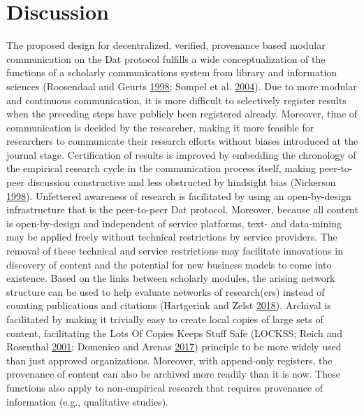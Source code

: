 \documentclass[a5paper]{book}
\begin{document}
\section{Discussion}\label{discussion-8}

The proposed design for decentralized, verified, provenance based
modular communication on the Dat protocol fulfills a wide
conceptualization of the functions of a scholarly communications system
from library and information sciences (Roosendaal and Geurts
\protect\hyperlink{ref-roosendaal1998}{1998}; Sompel et al.
\protect\hyperlink{ref-doi:10.1045ux2fseptember2004-vandesompel}{2004}).
Due to more modular and continuous communication, it is more difficult
to selectively register results when the preceding steps have publicly
been registered already. Moreover, time of communication is decided by
the researcher, making it more feasible for researchers to communicate
their research efforts without biases introduced at the journal stage.
Certification of results is improved by embedding the chronology of the
empirical research cycle in the communication process itself, making
peer-to-peer discussion constructive and less obstructed by hindsight
bias (Nickerson
\protect\hyperlink{ref-doi:10.1037ux2f1089-2680.2.2.175}{1998}).
Unfettered awareness of research is facilitated by using an
open-by-design infrastructure that is the peer-to-peer Dat protocol.
Moreover, because all content is open-by-design and independent of
service platforms, text- and data-mining may be applied freely without
technical restrictions by service providers. The removal of these
technical and service restrictions may facilitate innovations in
discovery of content and the potential for new business models to come
into existence. Based on the links between scholarly modules, the
arising network structure can be used to help evaluate networks of
research(ers) instead of counting publications and citations (Hartgerink
and Zelst
\protect\hyperlink{ref-doi:10.3390ux2fpublications6020021}{2018}).
Archival is facilitated by making it trivially easy to create local
copies of large sets of content, facilitating the Lots Of Copies Keeps
Stuff Safe (LOCKSS; Reich and Rosenthal
\protect\hyperlink{ref-doi:10.1045ux2fjune2001-reich}{2001}; Domenico
and Arenas
\protect\hyperlink{ref-doi:10.1103ux2fphysreve.95.022313}{2017})
principle to be more widely used than just approved organizations.
Moreover, with append-only registers, the provenance of content can also
be archived more readily than it is now. These functions also apply to
non-empirical research that requires provenance of information (e.g.,
qualitative studies).
\end{document}
